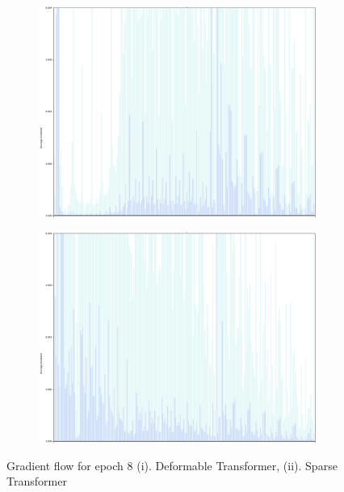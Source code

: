 \begin{figure}[h]
	\centering
	\begin{subfigure}[b]{0.55\textwidth}
		\includegraphics[width=\linewidth]{assets/img/deformable_grad_flow_epoch_8.png}
	\end{subfigure}%
	\begin{subfigure}[b]{0.55\textwidth}
		\includegraphics[width=\linewidth]{assets/img/sparse_grad_flow_epoch_8.png}
	\end{subfigure}
	\caption{Gradient flow for epoch 8 (i). Deformable Transformer, (ii). Sparse Transformer}
	
	\label{fig:gradientflowepoch8}
\end{figure}





